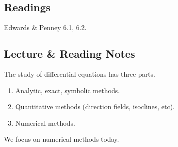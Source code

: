 \documentclass{article}
\begin{document}
\subsection{Readings}

Edwards \& Penney 6.1, 6.2.

\subsection{Lecture \& Reading Notes}

The study of differential equations has three parts.

\begin{enumerate}
\item Analytic, exact, symbolic methods.
\item Quantitative methods (direction fields, isoclines, etc).
\item Numerical methods.
\end{enumerate}

We focus on numerical methods today.

\printindex
\end{document}
